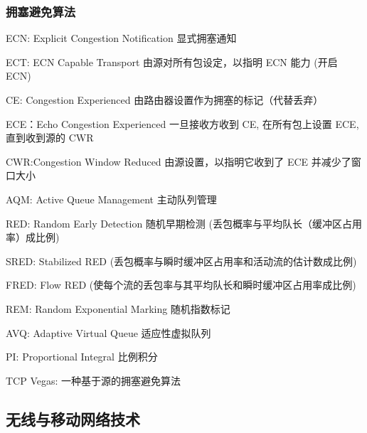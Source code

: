 \documentclass[UTF8,cs4size]{ctexart}
\begin{document}
\subsubsection{拥塞避免算法}
\begin{compactitem}
  \item ECN: Explicit Congestion Notification 显式拥塞通知
  \item ECT: ECN Capable Transport 由源对所有包设定，以指明 ECN 能力 (开启 ECN)
  \item CE: Congestion Experienced 由路由器设置作为拥塞的标记（代替丢弃）
  \item ECE：Echo Congestion Experienced 一旦接收方收到 CE, 在所有包上设置 ECE, 直到收到源的 CWR
  \item CWR:Congestion Window Reduced 由源设置，以指明它收到了 ECE 并减少了窗口大小
  \item AQM: Active Queue Management 主动队列管理
  \item RED: Random Early Detection 随机早期检测 (丢包概率与平均队长（缓冲区占用率）成比例)
  \item SRED: Stabilized RED (丢包概率与瞬时缓冲区占用率和活动流的估计数成比例)
  \item FRED: Flow RED (使每个流的丢包率与其平均队长和瞬时缓冲区占用率成比例)
  \item REM: Random Exponential Marking 随机指数标记
  \item AVQ: Adaptive Virtual Queue 适应性虚拟队列
  \item PI: Proportional Integral 比例积分
  \item TCP Vegas: 一种基于源的拥塞避免算法
\end{compactitem}

\subsection{无线与移动网络技术}
\end{document}
